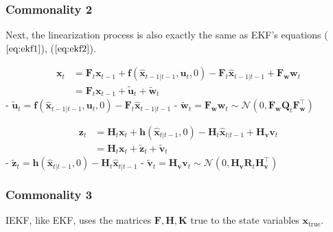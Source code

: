 \documentclass[10pt]{article}
\begin{document}
	
	
	\subsubsection{Commonality 2}
	Next, the linearization process is also exactly the same as EKF's equations ($\ref{eq:ekf1}$), ($\ref{eq:ekf2}$).
	
	\begin{equation} 
		\boxed{  \begin{aligned}
				\mathbf{x}_{t} & = \mathbf{F}_{t}\mathbf{x}_{t-1} + 
				\mathbf{f}(\hat{\mathbf{x}}_{t-1|t-1}, \mathbf{u}_{t} , 0 ) - \mathbf{F}_{t} \hat{\mathbf{x}}_{t-1|t-1} + \mathbf{F}_{\mathbf{w}} \mathbf{w}_{t} \\
				& =  \mathbf{F}_{t}\mathbf{x}_{t-1} + \tilde{\mathbf{u}}_{t} + \tilde{\mathbf{w}}_{t} 
		\end{aligned} }
	\end{equation}
	- $\tilde{\mathbf{u}}_{t} = \mathbf{f}(\hat{\mathbf{x}}_{t-1|t-1}, \mathbf{u}_{t} , 0 ) - \mathbf{F}_{t} \hat{\mathbf{x}}_{t-1|t-1}$
	- $\tilde{\mathbf{w}}_{t} = \mathbf{F}_{\mathbf{w}} \mathbf{w}_{t} \sim \mathcal{N}(0,  \mathbf{F}_{\mathbf{w}}\mathbf{Q}_{t} \mathbf{F}_{\mathbf{w}}^{\intercal})$
	
	\begin{equation} \label{eq:iekf1}
		\boxed{ \begin{aligned}
				\mathbf{z}_{t} & = \mathbf{H}_{t}\mathbf{x}_{t} + \mathbf{h}(\hat{\mathbf{x}}_{t|t-1}, 0) - \mathbf{H}_{t}\hat{\mathbf{x}}_{t|t-1} + \mathbf{H}_{\mathbf{v}}\mathbf{v}_{t} \\ 
				& = \mathbf{H}_{t}\mathbf{x}_{t}  + \tilde{\mathbf{z}}_{t} + \tilde{\mathbf{v}}_{t}
		\end{aligned} }
	\end{equation}
	- $\tilde{\mathbf{z}}_{t} = \mathbf{h}(\hat{\mathbf{x}}_{t|t-1}, 0) - \mathbf{H}_{t}\hat{\mathbf{x}}_{t|t-1}$
	- $\tilde{\mathbf{v}}_{t} = \mathbf{H}_{\mathbf{v}}\mathbf{v}_{t} \sim \mathcal{N}(0,  \mathbf{H}_{\mathbf{v}}\mathbf{R}_{t} \mathbf{H}_{\mathbf{v}}^{\intercal})$
	
	
	
	\subsubsection{Commonality 3}
	IEKF, like EKF, uses the matrices $\mathbf{F}, \mathbf{H}, \mathbf{K}$ true to the state variables $\mathbf{x}_{\text{true}}$.
	
	
	
\end{document}
